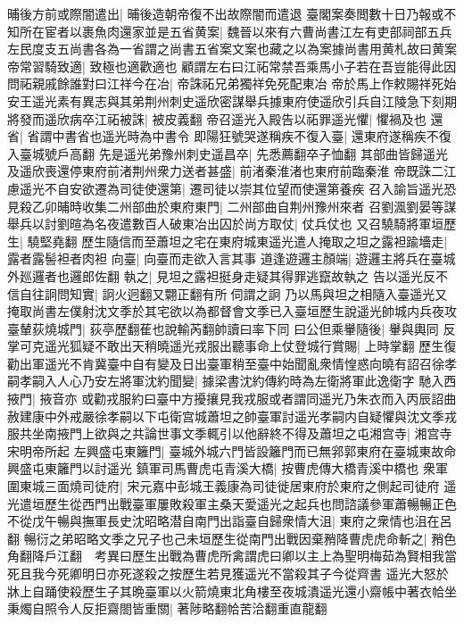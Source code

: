 晡後方前或際闇遣出|{
	晡後造朝帝復不出故際闇而遣退}
臺閣案奏閲數十日乃報或不知所在宦者以裹魚肉還家並是五省黄案|{
	魏晉以來有六曹尚書江左有吏部祠部五兵左民度支五尚書各為一省謂之尚書五省案文案也藏之以為案據尚書用黄札故曰黄案}
帝常習騎致適|{
	致極也適歡適也}
顧謂左右曰江祏常禁吾乘馬小子若在吾豈能得此因問祏親戚餘誰對曰江祥今在冶|{
	帝誅祏兄弟獨祥免死配東冶}
帝於馬上作敕賜祥死始安王遥光素有異志與其弟荆州刺史遥欣密謀舉兵據東府使遥欣引兵自江陵急下刻期將發而遥欣病卒江祏被誅|{
	被皮義翻}
帝召遥光入殿告以祏罪遥光懼|{
	懼禍及也}
還省|{
	省謂中書省也遥光時為中書令}
即陽狂號哭遂稱疾不復入臺|{
	還東府遂稱疾不復入臺城號戶高翻}
先是遥光弟豫州刺史遥昌卒|{
	先悉薦翻卒子恤翻}
其部曲皆歸遥光及遥欣喪還停東府前渚荆州衆力送者甚盛|{
	前渚秦淮渚也東府前臨秦淮}
帝既誅二江慮遥光不自安欲遷為司徒使還第|{
	遷司徒以崇其位望而使還第養疾}
召入諭旨遥光恐見殺乙卯晡時收集二州部曲於東府東門|{
	二州部曲自荆州豫州來者}
召劉渢劉晏等謀舉兵以討劉暄為名夜遣數百人破東冶出囚於尚方取仗|{
	仗兵仗也}
又召驍騎將軍垣歷生|{
	驍堅堯翻}
歷生隨信而至蕭坦之宅在東府城東遥光遣人掩取之坦之露袒踰墻走|{
	露者露髻袒者肉袒}
向臺|{
	向臺而走欲入言其事}
道逢遊邏主顏端|{
	遊邏主將兵在臺城外廵邏者也邏郎佐翻}
執之|{
	見坦之露袒挺身走疑其得罪逃竄故執之}
告以遥光反不信自往詗問知實|{
	詗火迥翻又翾正翻有所伺謂之詗}
乃以馬與坦之相隨入臺遥光又掩取尚書左僕射沈文季於其宅欲以為都督會文季已入臺垣歷生說遥光帥城内兵夜攻臺輦荻燒城門|{
	荻亭歷翻萑也說輸芮翻帥讀曰率下同}
曰公但乘轝隨後|{
	轝與輿同}
反掌可克遥光狐疑不敢出天稍曉遥光戎服出聽事命上仗登城行賞賜|{
	上時掌翻}
歷生復勸出軍遥光不肯冀臺中自有變及日出臺軍稍至臺中始聞亂衆情惶惑向曉有詔召徐孝嗣孝嗣入人心乃安左將軍沈約聞變|{
	據梁書沈約傳約時為左衛將軍此逸衛字}
馳入西掖門|{
	掖音亦}
或勸戎服約曰臺中方擾攘見我戎服或者謂同遥光乃朱衣而入丙辰詔曲赦建康中外戒嚴徐孝嗣以下屯衛宫城蕭坦之帥臺軍討遥光孝嗣内自疑懼與沈文季戎服共坐南掖門上欲與之共論世事文季輒引以他辭終不得及蕭坦之屯湘宫寺|{
	湘宫寺宋明帝所起}
左興盛屯東籬門|{
	臺城外城六門皆設籬門而已無郛郭東府在臺城東故命興盛屯東籬門以討遥光}
鎮軍司馬曹虎屯青溪大橋|{
	按曹虎傳大橋青溪中橋也}
衆軍圍東城三面燒司徒府|{
	宋元嘉中彭城王義康為司徒徙居東府於東府之側起司徒府}
遥光遣垣歷生從西門出戰臺軍屢敗殺軍主桑天愛遥光之起兵也問諮議參軍蕭暢暢正色不從戊午暢與撫軍長史沈昭略潜自南門出詣臺自歸衆情大沮|{
	東府之衆情也沮在呂翻}
暢衍之弟昭略文季之兄子也己未垣歷生從南門出戰因棄矟降曹虎虎命斬之|{
	矟色角翻降戶江翻　考異曰歷生出戰為曹虎所禽謂虎曰卿以主上為聖明梅茹為賢相我當死且我今死卿明日亦死遂殺之按歷生若見獲遥光不當殺其子今從齊書}
遥光大怒於牀上自踊使殺歷生子其晩臺軍以火箭燒東北角樓至夜城潰遥光還小齋帳中著衣帢坐秉燭自照令人反拒齋閤皆重關|{
	著陟略翻帢苦洽翻重直龍翻}
